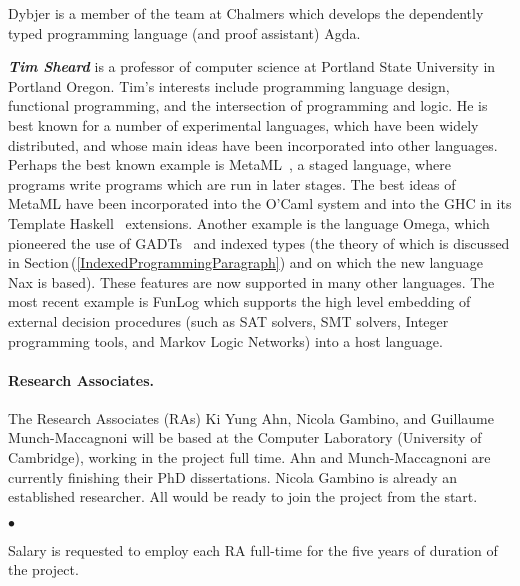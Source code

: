 \documentclass[11pt,twocolumn]{article}
\newenvironment{myitemize}
  {\begin{list}{$\bullet$}
  {\setlength{\topsep}{2pt}
   \setlength{\partopsep}{2pt}
   \setlength{\itemsep}{2.5pt}
   \setlength{\parsep}{2.5pt}
   \setlength{\leftmargin}{1em}
   \setlength{\labelwidth}{.5em}}}
  {\end{list}}
\newcommand{\pref}[1]{\,(\ref{#1})}
\begin{document}
Dybjer is a member of the team at Chalmers which develops the dependently
typed programming language (and proof assistant) Agda.  


\smallskip\noindent
\textbf{\em Tim Sheard} 
is a professor of computer science at Portland
State University in Portland Oregon. Tim's interests include
programming language design, functional programming, and the intersection of
programming and logic.  He is best known for
a number of experimental languages, which have been widely distributed,
and whose main ideas have been incorporated into other languages.
Perhaps the best known example is MetaML~\cite{TS97}, a staged language, where
programs write programs which are run in later stages. The best ideas
of MetaML have been incorporated into the O'Caml system and into the
GHC in its Template Haskell~\cite{Sheard:2002:TMP} extensions. Another example is the language
Omega, which pioneered the use of GADTs~\cite{Omega,sheardLFM04} and indexed types
(the theory of which is discussed in
Section\pref{IndexedProgrammingParagraph} and on which the new language Nax is based). These features
are now supported in many other languages. The most recent example is FunLog
which supports the high level embedding of external decision
procedures (such as SAT solvers, SMT solvers, Integer programming tools, and
Markov Logic Networks) into a host language. 

\paragraph*{Research Associates.}

The Research Associates (RAs) Ki Yung Ahn, Nicola Gambino, and Guillaume
Munch-Maccagnoni will be based at the Computer Laboratory (University of
Cambridge), working in the project full time.  Ahn and Munch-Maccagnoni are
currently finishing their PhD dissertations.  Nicola Gambino is already an
established researcher.  All would be ready to join the project from the
start.  
\begin{myitemize}
\item 
  Salary is requested to employ each RA full-time for the five years of
  duration of the project.
\end{myitemize}
\end{document}
